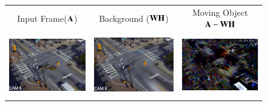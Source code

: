 \documentclass[10pt,journal,compsoc, onecolumn]{IEEEtran}
\begin{document}
\newcommand{\wdth}{1.65in}
\newcommand{\hght}{1.0725in}
\begin{figure}[th!]
\centering
\begin{tabular}{ccc}
Input Frame($\AA$) & Background ($\WW\HH$) & Moving Object $\AA-\WW\HH$ \\
\includegraphics[height=\hght,width=\wdth]{fig/input1.png} &  
\includegraphics[height=\hght,width=\wdth]{fig/lr1.png}&
\includegraphics[height=\hght,width=\wdth]{fig/err1-edit.png} \\

\end{tabular}
\end{figure}
\end{document}
